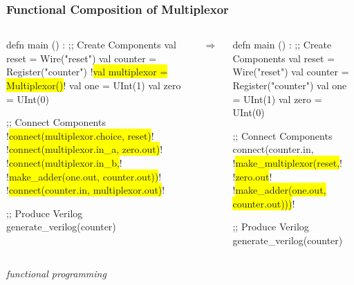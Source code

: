 \documentclass[xcolor=pdflatex,dvipsnames,table]{beamer}
\begin{document}
\begin{frame}[fragile]
\frametitle{Functional Composition of Multiplexor}
\begin{columns}
{
\begin{stanza}
defn main () :
  ;; Create Components
  val reset       = Wire("reset")
  val counter     = Register("counter")
  !\colorbox{yellow}{val multiplexor = Multiplexor()}!
  val one         = UInt(1)
  val zero        = UInt(0)

  ;; Connect Components
  !\colorbox{yellow}{connect(multiplexor.choice, reset)}!
  !\colorbox{yellow}{connect(multiplexor.in\_a, zero.out)}!
  !\colorbox{yellow}{connect(multiplexor.in\_b,}!
          !\colorbox{yellow}{make\_adder(one.out, counter.out))}!
  !\colorbox{yellow}{connect(counter.in, multiplexor.out)}!

  ;; Produce Verilog
  generate_verilog(counter)
\end{stanza}
}
\begin{center}
$\Rightarrow$
\end{center}
{
\begin{stanza}
defn main () :
  ;; Create Components
  val reset   = Wire("reset")
  val counter = Register("counter")
  val one     = UInt(1)
  val zero    = UInt(0)

  ;; Connect Components
  connect(counter.in, 
    !\colorbox{yellow}{make\_multiplexor(reset,}!
      !\colorbox{yellow}{zero.out}!
      !\colorbox{yellow}{make\_adder(one.out, counter.out)))}!

  ;; Produce Verilog
  generate_verilog(counter)
\end{stanza}
}
\end{columns}
\vspace{1cm}
{\it functional programming}
\end{frame}
\end{document}

